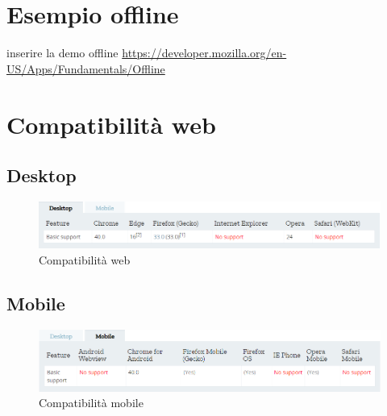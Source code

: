 \documentclass[italian]{article}
\begin{document}
\section{Esempio offline}
inserire la demo offline
\url{https://developer.mozilla.org/en-US/Apps/Fundamentals/Offline}
\pagebreak
\section{Compatibilità web}
\subsection{Desktop}
\begin{figure}
	\centering
	\includegraphics[width=1\linewidth]{CompWeb}
	\caption{Compatibilità web}
	\label{fig:Compatibilità web}
\end{figure}
\subsection{Mobile}
\begin{figure}
	\centering
	\includegraphics[width=1\linewidth]{CompMobile}
	\caption{Compatibilità mobile}
	\label{fig:Compatibilità mobile}
\end{figure}
\end{document}
